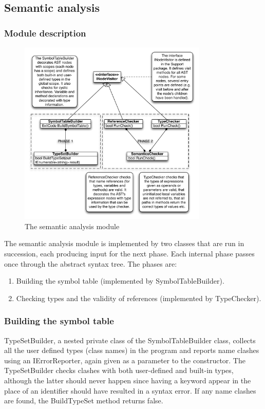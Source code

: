 \documentclass[a4paper,11pt]{article}
\begin{document}
\subsection{Semantic analysis}

\subsubsection{Module description}

\begin{figure}[h!]
\centering
\includegraphics[width=0.8\textwidth]{semantic_analysis.pdf}
\caption{The semantic analysis module}
\end{figure}

The semantic analysis module is implemented by two classes that are run in succession, each producing input for the next phase. Each internal phase passes once through the abstract syntax tree. The phases are:

\begin{enumerate}
\item Building the symbol table (implemented by SymbolTableBuilder).
\item Checking types and the validity of references (implemented by TypeChecker).
\end{enumerate}

\subsubsection{Building the symbol table}

TypeSetBuilder, a nested private class of the SymbolTableBuilder class, collects all the user defined types (class names) in the program and reports name clashes using an IErrorReporter, again given as a parameter to the constructor. The TypeSetBuilder checks clashes with both user-defined and built-in types, although the latter should never happen since having a keyword appear in the place of an identifier should have resulted in a syntax error. If any name clashes are found, the BuildTypeSet method returns false.
\end{document}
